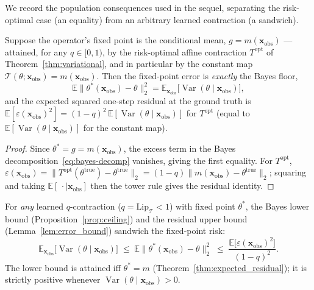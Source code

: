 We record the population consequences used in the sequel, separating the risk-optimal case (an equality) from an arbitrary learned contraction (a sandwich).

\begin{theorem}
\label{thm:expected_residual}
Suppose the operator's fixed point is the conditional mean, $g=m(\mathbf{x}_\mathrm{obs})$ --- attained, for any $q\in[0,1)$, by the risk-optimal affine contraction $T^{\mathrm{opt}}$ of Theorem~\ref{thm:variational}, and in particular by the constant map $\mathcal{T}(\theta;\mathbf{x}_\mathrm{obs})=m(\mathbf{x}_\mathrm{obs})$. Then the fixed-point error is \emph{exactly} the Bayes floor,
\begin{equation}
    \mathbb{E}\big\|\theta^*(\mathbf{x}_\mathrm{obs})-\theta\big\|_2^2 = \mathbb{E}_{\mathbf{x}_\mathrm{obs}}\big[\operatorname{Var}(\theta\mid\mathbf{x}_\mathrm{obs})\big],
\end{equation}
and the expected squared one-step residual at the ground truth is $\mathbb{E}[\varepsilon(\mathbf{x}_\mathrm{obs})^2]=(1-q)^2\,\mathbb{E}[\operatorname{Var}(\theta\mid\mathbf{x}_\mathrm{obs})]$ for $T^{\mathrm{opt}}$ (equal to $\mathbb{E}[\operatorname{Var}(\theta\mid\mathbf{x}_\mathrm{obs})]$ for the constant map).
\end{theorem}

\begin{proof}
Since $\theta^*=g=m(\mathbf{x}_\mathrm{obs})$, the excess term in the Bayes decomposition~\eqref{eq:bayes-decomp} vanishes, giving the first equality. For $T^{\mathrm{opt}}$, $\varepsilon(\mathbf{x}_\mathrm{obs})=\|T^{\mathrm{opt}}(\theta^{\mathrm{true}})-\theta^{\mathrm{true}}\|_2=(1-q)\|m(\mathbf{x}_\mathrm{obs})-\theta^{\mathrm{true}}\|_2$; squaring and taking $\mathbb{E}[\,\cdot\mid\mathbf{x}_\mathrm{obs}]$ then the tower rule gives the residual identity.
\end{proof}

\begin{corollary}
\label{cor:lower_bound}
For \emph{any} learned $q$-contraction ($q=\mathrm{Lip}_\mathcal{T}<1$) with fixed point $\theta^*$, the Bayes lower bound (Proposition~\ref{prop:ceiling}) and the residual upper bound (Lemma~\ref{lem:error_bound}) sandwich the fixed-point risk:
\begin{equation}
    \mathbb{E}_{\mathbf{x}_\mathrm{obs}}\big[\operatorname{Var}(\theta\mid\mathbf{x}_\mathrm{obs})\big]
    \;\le\;
    \mathbb{E}\big\|\theta^*(\mathbf{x}_\mathrm{obs})-\theta\big\|_2^2
    \;\le\;
    \frac{\mathbb{E}\big[\varepsilon(\mathbf{x}_\mathrm{obs})^2\big]}{(1-q)^2}.
\end{equation}
The lower bound is attained iff $\theta^*=m$ (Theorem~\ref{thm:expected_residual}); it is strictly positive whenever $\operatorname{Var}(\theta\mid\mathbf{x}_\mathrm{obs})>0$.
\end{corollary}

